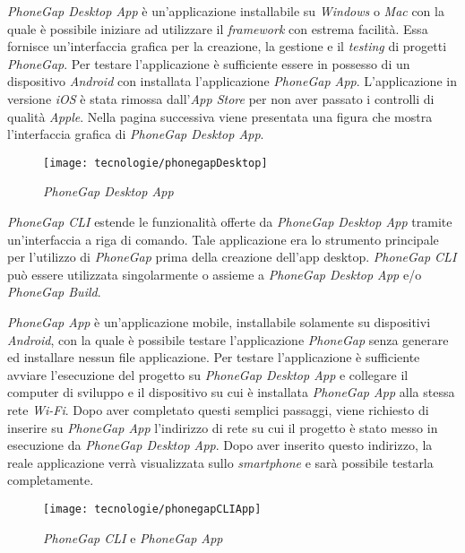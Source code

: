 \textit{PhoneGap Desktop App} è un'applicazione installabile su \textit{Windows} o \textit{Mac} con la quale è possibile iniziare ad utilizzare il \textit{framework} con estrema facilità. Essa fornisce un'interfaccia grafica per la creazione, la gestione e il \textit{testing} di progetti \textit{PhoneGap}. Per testare l'applicazione è sufficiente essere in possesso di un dispositivo \textit{Android} con installata l'applicazione \textit{PhoneGap App}. L'applicazione in versione \textit{iOS} è stata rimossa dall'\textit{App Store} per non aver passato i controlli di qualità \textit{Apple}. Nella pagina successiva viene presentata una figura che mostra l'interfaccia grafica di \textit{PhoneGap Desktop App}.

\begin{figure}[!h] 
    \centering 
    \texttt{[image: tecnologie/phonegapDesktop]} 
    \caption{\textit{PhoneGap Desktop App}}
\end{figure}

\newpage

\textit{PhoneGap CLI} estende le funzionalità offerte da \textit{PhoneGap Desktop App} tramite un'interfaccia a riga di comando. Tale applicazione era lo strumento principale per l'utilizzo di \textit{PhoneGap} prima della creazione dell'app desktop. \textit{PhoneGap CLI} può essere utilizzata singolarmente o assieme a \textit{PhoneGap Desktop App} e/o \textit{PhoneGap Build}.

\textit{PhoneGap App} è un'applicazione mobile, installabile solamente su dispositivi \textit{Android}, con la quale è possibile testare l'applicazione \textit{PhoneGap} senza generare ed installare nessun file applicazione. Per testare l'applicazione è sufficiente avviare l'esecuzione del progetto su \textit{PhoneGap Desktop App} e collegare il computer di sviluppo e il dispositivo su cui è installata \textit{PhoneGap App} alla stessa rete \textit{Wi-Fi}. Dopo aver completato questi semplici passaggi, viene richiesto di inserire su \textit{PhoneGap App} l'indirizzo di rete su cui il progetto è stato messo in esecuzione da \textit{PhoneGap Desktop App}. Dopo aver inserito questo indirizzo, la reale applicazione verrà visualizzata sullo \textit{smartphone} e sarà possibile testarla completamente.

\begin{figure}[!h] 
    \centering 
    \texttt{[image: tecnologie/phonegapCLIApp]} 
    \caption{\textit{PhoneGap CLI} e \textit{PhoneGap App}}
\end{figure}

